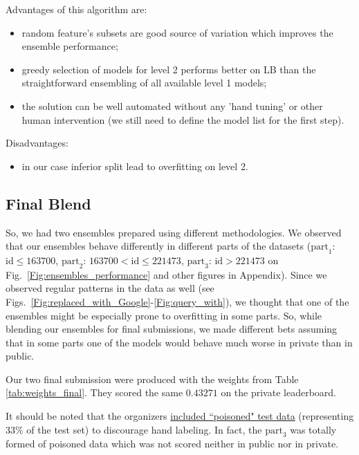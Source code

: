 \documentclass[12pt]{article}
\begin{document}
{{Advantages of this algorithm are:
\begin{itemize}
\item random feature's subsets are good source of variation which improves the ensemble performance;
\item greedy selection of models for level 2 performs better on LB than the straightforward ensembling of all available level 1 models;
\item the solution can be well automated without any 'hand tuning' or other human intervention (we still need to define the model list for the first step).
\end{itemize}

Disadvantages:
\begin{itemize}
\item  in our case inferior split lead to overfitting on level 2.
\end{itemize}


\subsection{Final Blend}
\label{subsec:final_blend_description}
So, we had two ensembles prepared using different methodologies. We observed that our ensembles behave differently in different parts of the datasets ($\text{part}_1$:  $\text{id} \leq 163700$,  $\text{part}_2$:  $163700<\text{id} \leq 221473$,
$\text{part}_3$:  $\text{id} > 221473$  on  Fig.~\ref{Fig:ensembles_performance}  and other figures in Appendix).  Since we observed regular patterns in the data as well (see Figs.~\ref{Fig:replaced_with_Google}-\ref{Fig:query_with}), we thought that one of the ensembles might be especially prone to overfitting in some parts. So, while blending our ensembles for final submissions, we made different bets assuming that in some parts one of the models would behave much worse in private than in public.

Our two final submission were produced with the weights from Table \ref{tab:weights_final}. They scored the same $0.43271$ on the private leaderboard.

It should be noted that the organizers  \href{https://www.kaggle.com/c/home-depot-product-search-relevance/forums/t/20491/last-20k-rows/117311}{included ``poisoned" test data} (representing $33\%$ of the test set) to discourage hand labeling. In fact, the $\text{part}_3$ was totally formed of poisoned data which was not scored neither in public nor in private.

}}
\end{document}
